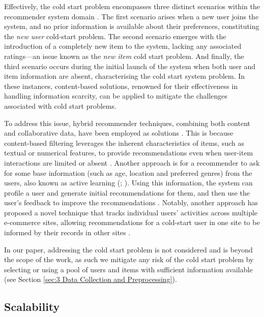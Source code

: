 Effectively, the cold start problem encompasses three distinct scenarios within the recommender system domain \cite{lika2014facing}. The first scenario arises when a new user joins the system, and no prior information is available about their preferences, constituting the \textit{new user} cold-start problem. The second scenario emerges with the introduction of a completely new item to the system, lacking any associated ratings—an issue known as the \textit{new item} cold start problem. And finally, the third scenario occurs during the initial launch of the system when both user and item information are absent, characterising the cold start system problem. In these instances, content-based solutions, renowned for their effectiveness in handling information scarcity, can be applied to mitigate the challenges associated with cold start problems.

To address this issue, hybrid recommender techniques, combining both content and collaborative data, have been employed as solutions \cite{lika2014facing}. This is because content-based filtering leverages the inherent characteristics of items, such as textual or numerical features, to provide recommendations even when user-item interactions are limited or absent \cite{lika2014facing}. Another approach is for a recommender to ask for some base information (such as age, location and preferred genres) from the users, also known as active learning (\cite{burke2015robust}; \cite{zheng2010collaborative}). Using this information, the system can profile a user and generate initial recommendations for them, and then use the user's feedback to improve the recommendations \cite{zheng2010collaborative}. Notably, another approach has proposed a novel technique that tracks individual users' activities across multiple e-commerce sites, allowing recommendations for a cold-start user in one site to be informed by their records in other sites \cite{liu2014promoting}.

In our paper, addressing the cold start problem is not considered and is beyond the scope of the work, as such we mitigate any risk of the cold start problem by selecting or using a pool of users and items with sufficient information available (see Section \ref{sec:3 Data Collection and Preprocessing}).

\subsection{Scalability}
\label{subsec:2 Scalability}


